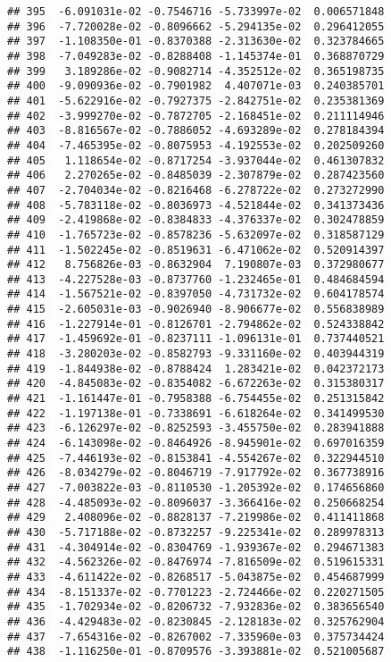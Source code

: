 \documentclass[
]{article}
\begin{document}
\begin{verbatim}
## 395  -6.091031e-02 -0.7546716 -5.733997e-02  0.006571848
## 396  -7.720028e-02 -0.8096662 -5.294135e-02  0.296412055
## 397  -1.108350e-01 -0.8370388 -2.313630e-02  0.323784665
## 398  -7.049283e-02 -0.8288408 -1.145374e-01  0.368870729
## 399   3.189286e-02 -0.9082714 -4.352512e-02  0.365198735
## 400  -9.090936e-02 -0.7901982  4.407071e-03  0.240385701
## 401  -5.622916e-02 -0.7927375 -2.842751e-02  0.235381369
## 402  -3.999270e-02 -0.7872705 -2.168451e-02  0.211114946
## 403  -8.816567e-02 -0.7886052 -4.693289e-02  0.278184394
## 404  -7.465395e-02 -0.8075953 -4.192553e-02  0.202509260
## 405   1.118654e-02 -0.8717254 -3.937044e-02  0.461307832
## 406   2.270265e-02 -0.8485039 -2.307879e-02  0.287423560
## 407  -2.704034e-02 -0.8216468 -6.278722e-02  0.273272990
## 408  -5.783118e-02 -0.8036973 -4.521844e-02  0.341373436
## 409  -2.419868e-02 -0.8384833 -4.376337e-02  0.302478859
## 410  -1.765723e-02 -0.8578236 -5.632097e-02  0.318587129
## 411  -1.502245e-02 -0.8519631 -6.471062e-02  0.520914397
## 412   8.756826e-03 -0.8632904  7.190807e-03  0.372980677
## 413  -4.227528e-03 -0.8737760 -1.232465e-01  0.484684594
## 414  -1.567521e-02 -0.8397050 -4.731732e-02  0.604178574
## 415  -2.605031e-03 -0.9026940 -8.906677e-02  0.556838989
## 416  -1.227914e-01 -0.8126701 -2.794862e-02  0.524338842
## 417  -1.459692e-01 -0.8237111 -1.096131e-01  0.737440521
## 418  -3.280203e-02 -0.8582793 -9.331160e-02  0.403944319
## 419  -1.844938e-02 -0.8788424  1.283421e-02  0.042372173
## 420  -4.845083e-02 -0.8354082 -6.672263e-02  0.315380317
## 421  -1.161447e-01 -0.7958388 -6.754455e-02  0.251315842
## 422  -1.197138e-01 -0.7338691 -6.618264e-02  0.341499530
## 423  -6.126297e-02 -0.8252593 -3.455750e-02  0.283941888
## 424  -6.143098e-02 -0.8464926 -8.945901e-02  0.697016359
## 425  -7.446193e-02 -0.8153841 -4.554267e-02  0.322944510
## 426  -8.034279e-02 -0.8046719 -7.917792e-02  0.367738916
## 427  -7.003822e-03 -0.8110530 -1.205392e-02  0.174656860
## 428  -4.485093e-02 -0.8096037 -3.366416e-02  0.250668254
## 429   2.408096e-02 -0.8828137 -7.219986e-02  0.411411868
## 430  -5.717188e-02 -0.8732257 -9.225341e-02  0.289978313
## 431  -4.304914e-02 -0.8304769 -1.939367e-02  0.294671383
## 432  -4.562326e-02 -0.8476974 -7.816509e-02  0.519615331
## 433  -4.611422e-02 -0.8268517 -5.043875e-02  0.454687999
## 434  -8.151337e-02 -0.7701223 -2.724466e-02  0.220271505
## 435  -1.702934e-02 -0.8206732 -7.932836e-02  0.383656540
## 436  -4.429483e-02 -0.8230845 -2.128183e-02  0.325762904
## 437  -7.654316e-02 -0.8267002 -7.335960e-03  0.375734424
## 438  -1.116250e-01 -0.8709576 -3.393881e-02  0.521005687

\end{verbatim}
\end{document}
